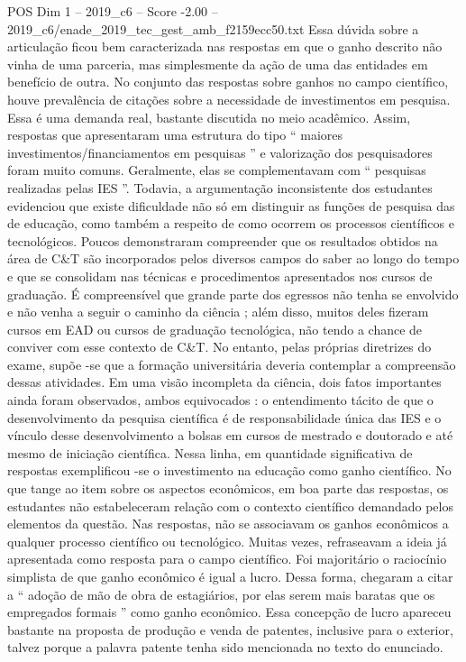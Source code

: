 \begin{textsample}{POS Dim 1 – 2019\_c6 – Score -2.00 – 2019\_c6/enade\_2019\_tec\_gest\_amb\_f2159ecc50.txt}
Essa dúvida sobre a articulação ficou bem caracterizada nas respostas em que o ganho descrito não vinha de uma parceria, mas simplesmente da ação de uma das entidades em benefício de outra.
No conjunto das respostas sobre ganhos no campo científico, houve prevalência de citações sobre a necessidade de investimentos em pesquisa.
Essa é uma demanda real, bastante discutida no meio acadêmico.
Assim, respostas que apresentaram uma estrutura do tipo “ maiores investimentos/financiamentos em pesquisas ” e valorização dos pesquisadores foram muito comuns.
Geralmente, elas se complementavam com “ pesquisas realizadas pelas IES ”.
Todavia, a argumentação inconsistente dos estudantes evidenciou que existe dificuldade não só em distinguir as funções de pesquisa das de educação, como também a respeito de como ocorrem os processos científicos e tecnológicos.
Poucos demonstraram compreender que os resultados obtidos na área de C\&T são incorporados pelos diversos campos do saber ao longo do tempo e que se consolidam nas técnicas e procedimentos apresentados nos cursos de graduação.
É compreensível que grande parte dos egressos não tenha se envolvido e não venha a seguir o caminho da ciência ; além disso, muitos deles fizeram cursos em EAD ou cursos de graduação tecnológica, não tendo a chance de conviver com esse contexto de C\&T.
No entanto, pelas próprias diretrizes do exame, supõe -se que a formação universitária deveria contemplar a compreensão dessas atividades.
Em uma visão incompleta da ciência, dois fatos importantes ainda foram observados, ambos equivocados : o entendimento tácito de que o desenvolvimento da pesquisa científica é de responsabilidade única das IES e o vínculo desse desenvolvimento a bolsas em cursos de mestrado e doutorado e até mesmo de iniciação científica.
Nessa linha, em quantidade significativa de respostas exemplificou -se o investimento na educação como ganho científico.
No que tange ao item sobre os aspectos econômicos, em boa parte das respostas, os estudantes não estabeleceram relação com o contexto científico demandado pelos elementos da questão.
Nas respostas, não se associavam os ganhos econômicos a qualquer processo científico ou tecnológico.
Muitas vezes, refraseavam a ideia já apresentada como resposta para o campo científico.
Foi majoritário o raciocínio simplista de que ganho econômico é igual a lucro.
Dessa forma, chegaram a citar a “ adoção de mão de obra de estagiários, por elas serem mais baratas que os empregados formais ” como ganho econômico.
Essa concepção de lucro apareceu bastante na proposta de produção e venda de patentes, inclusive para o exterior, talvez porque a palavra patente tenha sido mencionada no texto do enunciado.

\end{textsample}
